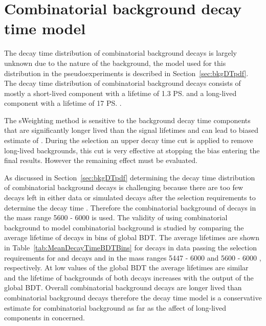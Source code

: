\section{Combinatorial background decay time model}
\label{sec:CBGdecytimemodel}

The decay time distribution of combinatorial background decays is largely unknown due to the nature of the background, the model used for this distribution in the pseudoexperiments is described in Section~\ref{sec:bkgDTpdf}. The decay time distribution of combinatorial background decays consists of mostly a short-lived component with a lifetime of 1.3 \ps and a long-lived component with a lifetime of 17 \ps.

The sWeighting method is sensitive to the background decay time components that are significantly longer lived than the signal lifetimes and can lead to biased estimate of \tmumu. 
During the selection an upper decay time cut is applied to remove long-lived backgrounds, this cut is very effective at stopping the bias entering the final results. However the remaining effect must be evaluated.

As discussed in Section~\ref{sec:bkgDTpdf} determining the decay time distribution of combinatorial background decays is challenging because there are too few decays left in either data or \bbbarmumux simulated decays after the selection requirements to determine the decay time \pdf. Therefore the combinatorial background of \bhh decays in the mass range 5600 - 6000 \mevcc is used. The validity of using \bhh combinatorial background to model \bsmumu combinatorial background is studied by comparing the average lifetime of decays in bins of global BDT. The average lifetimes are shown in Table~\ref{tab:MeanDecayTimeBDTBins} for decays in data passing the selection requirements for \bsmumu and \bhh decays and in the mass ranges 5447 - 6000 \mevcc and 5600 - 6000 \mevcc, respectively. At low values of the global BDT the average lifetimes are similar and the lifetime of backgrounds of both decays increases with the output of the global BDT. Overall \bhh combinatorial background decays are longer lived than \bsmumu combinatorial background decays therefore the \bhh decay time model is a conservative estimate for \bsmumu combinatorial background as far as the affect of long-lived components in concerned. 


